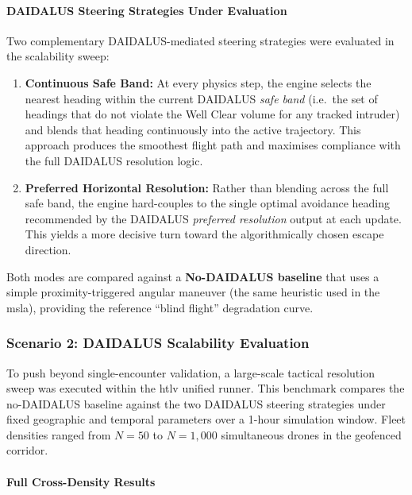 \paragraph{DAIDALUS Steering Strategies Under Evaluation}
\label{sec:action_modes}
Two complementary DAIDALUS-mediated steering strategies were evaluated in the scalability sweep:
\begin{enumerate}
    \item \textbf{Continuous Safe Band:} At every physics step, the engine selects the nearest
    heading within the current DAIDALUS \emph{safe band} (i.e.\ the set of headings that
    do not violate the Well Clear volume for any tracked intruder) and blends that heading
    continuously into the active trajectory. This approach produces the smoothest flight path
    and maximises compliance with the full DAIDALUS resolution logic.

    \item \textbf{Preferred Horizontal Resolution:} Rather than blending across the full safe
    band, the engine hard-couples to the single optimal avoidance heading recommended by the
    DAIDALUS \emph{preferred resolution} output at each update. This yields a more decisive
    turn toward the algorithmically chosen escape direction.
\end{enumerate}

\noindent Both modes are compared against a \textbf{No-DAIDALUS baseline} that uses a simple
proximity-triggered angular maneuver (the same heuristic used in the \gls{msla}), providing
the reference ``blind flight'' degradation curve.

\subsubsection{Scenario 2: DAIDALUS Scalability Evaluation}
\label{sec:scen2_sweep}

To push beyond single-encounter validation, a large-scale tactical resolution sweep was
executed within the \gls{htlv} unified runner. This benchmark compares the no-DAIDALUS
baseline against the two DAIDALUS steering strategies under fixed geographic and temporal
parameters over a 1-hour simulation window. Fleet densities ranged from $N = 50$ to
$N = 1{,}000$ simultaneous drones in the geofenced corridor.

\paragraph{Full Cross-Density Results}

